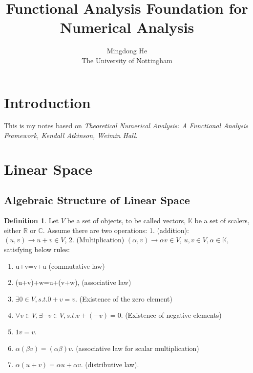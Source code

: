 \documentclass{article}
\theoremstyle{definition}
\newtheorem{definition}{Definition}[section]
\begin{document}

\title{Functional Analysis Foundation for Numerical Analysis} %
\author{Mingdong He\\The University of Nottingham} 

\maketitle

\tableofcontents
%
\section{Introduction}
This is my notes based on \textit{Theoretical Numerical Analysis: A Functional Analysis Framework, Kendall Atkinson, Weimin Hall}. 
\section{Linear Space}
\subsection{Algebraic Structure of Linear Space}
\begin{definition}
Let $V$ be a set of objects, to be called vectors, $\mathbb{K}$ be a set of scalers, either $\mathbb{R}$ or $\mathbb{C}$. Assume there are two operations: 1. (addition): $(u,v) \to u+v \in V$, 2. (Multiplication) $(\alpha,v) \to \alpha v \in V$, $u,v \in V, \alpha \in \mathbb{K}$, satisfying below rules:
\begin{enumerate}
	\item u+v=v+u (commutative law)
	\item (u+v)+w=u+(v+w), (associative law)
	\item $\exists 0 \in V, s.t. 0+v=v$. (Existence of the zero element)
	\item $\forall v \in V, \exists -v \in V, s.t. v+(-v)=0$. (Existence of negative elements)
	\item $1v=v$.
	\item $\alpha(\beta v)=(\alpha \beta)v$. (associative law for scalar multiplication)
	\item $\alpha(u+v)=\alpha u+\alpha v$. (distributive law).
\end{enumerate}	
\end{definition}
\end{document}
